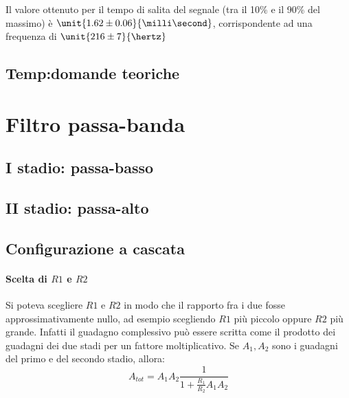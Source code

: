 \documentclass[10pt,a4paper]{article}
\begin{document}
Il valore ottenuto per il tempo di salita del segnale (tra il 10\% e il 90\% del massimo) è $\unit{1.62 \pm 0.06}{\milli\second}$, corrispondente ad una frequenza di $\unit{216 \pm 7}{\hertz}$

\subsection{Temp:domande teoriche}

\section{Filtro passa-banda}

\subsection{I stadio: passa-basso}

\subsection{II stadio: passa-alto}

\subsection{Configurazione a cascata}

\paragraph{Scelta di $R1$ e $R2$} Si poteva scegliere $R1$ e $R2$ in modo che il rapporto fra i due fosse approssimativamente nullo, ad esempio scegliendo $R1$ più piccolo oppure $R2$ più grande.
Infatti il guadagno complessivo può essere scritta come il prodotto dei guadagni dei due stadi per un fattore moltiplicativo. Se $A_1, A_2$ sono i guadagni del primo e del secondo stadio, allora:
\begin{equation*}
A_{tot} = A_1 A_2 \frac{1}{1 + \frac{R_1}{R_2} A_1 A_2}
\end{equation*}


\end{document}
